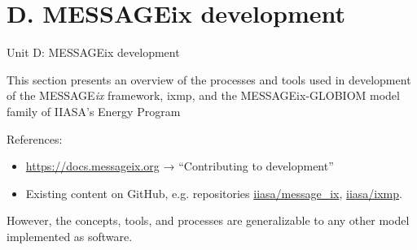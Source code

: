 \documentclass[12pt,aspectratio=169]{beamer}
\begin{document}
\section*{D. MESSAGEix development}
\begin{frame}{Unit D: MESSAGEix development}

  This section presents an overview of the processes and tools used in development of the MESSAGE\emph{ix} framework, ixmp, and the MESSAGEix-GLOBIOM model family of IIASA's Energy Program

  \medskip
  References:
  \begin{itemize}
    \item \url{https://docs.messageix.org} → “Contributing to development”

    \item Existing content on GitHub, e.g. repositories
          \href{https://github.com/iiasa/message_ix}{\ttfamily iiasa/message\_ix},
          \href{https://github.com/iiasa/ixmp}{\ttfamily iiasa/ixmp}.
  \end{itemize}

  \medskip
  However, the concepts, tools, and processes are generalizable to any other model implemented as software.


\end{frame}
\end{document}

